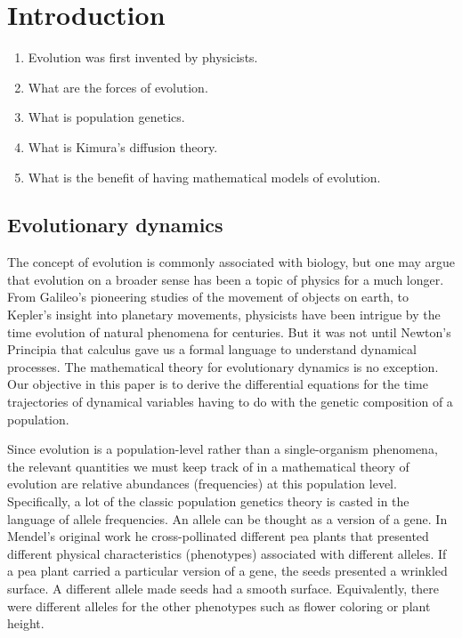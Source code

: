 \section{Introduction}

\begin{enumerate}
    \item Evolution was first invented by physicists.
    \item What are the forces of evolution.
    \item What is population genetics.
    \item What is Kimura's diffusion theory.
    \item What is the benefit of having mathematical models of evolution.
\end{enumerate}

\subsection{Evolutionary dynamics}

\noindent
The concept of evolution is commonly associated with biology, but one may argue
that evolution on a broader sense has been a topic of physics for a much longer.
From Galileo's pioneering studies of the movement of objects on earth, to
Kepler's insight into planetary movements, physicists have been intrigue by the
time evolution of natural phenomena for centuries. But it was not until Newton's
Principia that calculus gave us a formal language to understand dynamical
processes. The mathematical theory for evolutionary dynamics is no exception.
Our objective in this paper is to derive the differential equations for the time
trajectories of dynamical variables having to do with the genetic composition of
a population.

Since evolution is a population-level rather than a single-organism phenomena,
the relevant quantities we must keep track of in a mathematical theory of
evolution are relative abundances (frequencies) at this population level.
Specifically, a lot of the classic population genetics theory is casted in the
language of allele frequencies. An allele can be thought as a version of a gene.
In Mendel's original work he cross-pollinated different pea plants that
presented different physical characteristics (phenotypes) associated with
different alleles. If a pea plant carried a particular version of a gene, the
seeds presented a wrinkled surface. A different allele made seeds had a smooth
surface. Equivalently, there were different alleles for the other phenotypes
such as flower coloring or plant height.

